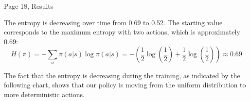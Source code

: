 Page 18, Results

The entropy is decreasing over time from 0.69 to 0.52. The starting value corresponds to the maximum entropy with two actions, which is approximately 0.69:
\begin{equation*}
H(\pi) = -\sum_a \pi(a|s)\log \pi(a|s) = - (\frac{1}{2} \log(\frac{1}{2}) + \frac{1}{2} \log(\frac{1}{2})) \approx 0.69
\end{equation*}

The fact that the entropy is decreasing during the training, as indicated by the following chart,   shows that our policy is moving from the uniform distribution to more deterministic actions.


